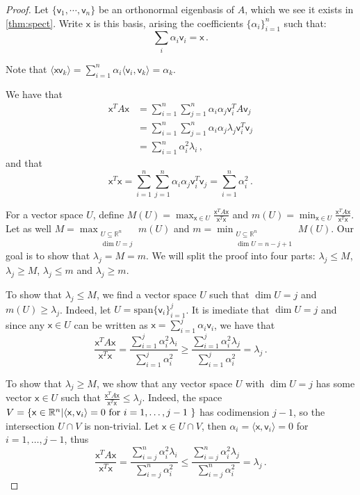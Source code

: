 \documentclass[12pt]{amsart}
\theoremstyle{definition}
\newcommand{\R}{\mathbb{R}}
\newcommand{\vv}{\mathsf{v}}
\newcommand{\vx}{\mathsf{x}}
\newcommand{\spn}{\mathrm{span}}
\begin{document}
\begin{proof}
Let $\{\vv_1, \cdots , \vv_n\}$ be an orthonormal eigenbasis of $A$, which we see it exists in \cref{thm:spect}.
Write $\vx$ is this basis, arising the coefficients $\{\alpha_i\}_{i=1}^n$ such that:
$$ \sum_i \alpha_i \vv_i = \vx \, . $$

Note that $\langle \vx \vv_k \rangle = \sum_{i=1}^n \alpha_i \langle \vv_i, \vv_k \rangle = \alpha_k$.

We have that 
\begin{align*}
\vx^T A \vx &= \sum_{i=1}^n \sum_{j=1}^n \alpha_i \alpha_j \vv_i^T A \vv_j \\
&= \sum_{i=1}^n \sum_{j=1}^n \alpha_i \alpha_j \lambda_j \vv_i^T \vv_j\\
&= \sum_{i=1}^n \alpha_i^2 \lambda_i\, , 
\end{align*}
and that 
$$ \vx^T \vx = \sum_{i=1}^n \sum_{j=1}^n \alpha_i \alpha_j \vv_i^T \vv_j = \sum_{i=1}^n \alpha_i^2\, . $$

For a vector space $U$, define $M(U) = \max_{\vx \in U} \frac{\vx^T A \vx}{\vx^T\vx}$ and $m(U) = \min_{\vx \in U} \frac{\vx^T A \vx}{\vx^T\vx}$.
Let as well $M = \max_{\substack{U \subseteq \R^n \\ \dim U = j}} m(U)$ and $m = \min_{\substack{U \subseteq \R^n \\ \dim U = n-j+1}} M(U)$.
Our goal is to show that $\lambda_j = M = m$.
We will split the proof into four parts: $\lambda_j \leq M$,  $\lambda_j \geq M$,  $\lambda_j \leq m$ and $\lambda_j \geq m$.

To show that  $\lambda_j \leq M$, we find a vector space $U$ such that $\dim U = j $ and $m(U) \geq \lambda_j$.
Indeed, let $U = \spn \{\vv_i\}_{i=1}^j$.
It is imediate that $\dim U = j$ and since any $\vx \in U $ can be written as $\vx = \sum_{i=1}^j \alpha_i \vv_i$, we have that 
$$\frac{\vx^T A \vx}{\vx^T \vx} = \frac{\sum_{i=1}^j \alpha_i^2 \lambda_i}{\sum_{i=1}^j \alpha_i^2} \geq \frac{\sum_{i=1}^j \alpha_i^2 \lambda_j}{\sum_{i=1}^j \alpha_i^2}= \lambda_j\, . $$


To show that $\lambda_j \geq M$, we show that any vector space $U$ with $\dim U = j $ has some vector $\vx \in U $ such that $\frac{\vx^T A \vx}{\vx^T \vx} \leq \lambda_j$.
Indeed, the space $V = \{ \vx \in \R^n | \langle \vx , \vv_i \rangle = 0 \text{ for $ i = 1, \ldots, j-1$ } \}$ has codimension $j-1$, so the intersection $U\cap V$ is non-trivial.
Let $\vx \in U \cap V$, then $\alpha_i = \langle \vx , \vv_i \rangle = 0 $ for $i = 1, \ldots, j-1$, thus 
$$\frac{\vx^T A \vx}{\vx^T \vx} = \frac{\sum_{i=j}^n \alpha_i^2 \lambda_i}{\sum_{i=j}^n \alpha_i^2} \leq \frac{\sum_{i=j}^n \alpha_i^2 \lambda_j}{\sum_{i=j}^n \alpha_i^2}= \lambda_j\, . $$



\end{proof}
\end{document}
